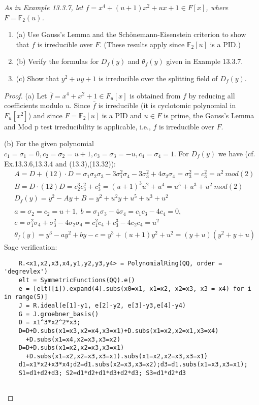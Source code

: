 \documentclass[11pt,a4paper]{article}
\newcommand{\be} {\begin{enumerate}}
\newcommand{\ee} {\end{enumerate}}
\begin{document}
{\it As in Example 13.3.7, let $f=x^4+(u+1)x^2+ux+1 \in F[x]$, where $F=\mathbb{F}_2(u)$.
\be
\item[(a)] Use Gauss's Lemma and the Sch\"onemann-Eisenstein criterion to show that $f$ is irreducible over $F$. (These results apply since $\mathbb{F}_2[u]$ is a PID.) 
\item[(b)] Verify the formulas for $D_f(y)$ and $\theta_f(y)$ given in Example 13.3.7.
\item[(c)] Show that $y^2+uy+1$ is irreducible over the splitting field of $D_f(y)$.
\ee
\begin{proof}
\item[(a)] Let 
$\bar f=x^4+x^2+1\in F_u[x]$ is obtained from $f$ by reducing all coefficients modulo $u$. Since $\bar f$ is irreducible (it is cyclotomic polynomial in $F_u[x^2]$) and since $F=\mathbb{F}_2[u]$ is a PID and $u \in F$ is prime, the Gauss's Lemma and Mod p test irreducibility is applicable, i.e., $f$ is irreducible over $F$.

\item[(b)] For the given polynomial $c_1=\sigma_1=0,c_2=\sigma_2=u+1,c_3=\sigma_3=-u,c_4=\sigma_4=1$. For $D_f(y)$ we have (cf. Ex.13.3.6,13.3.4 and (13.3),(13.32)):
\begin{align*}
& A=D+(12)\cdot D =\sigma_1\sigma_2\sigma_3 -3 \sigma_1^2 \sigma_4 -3\sigma_3^2 + 4\sigma_2 \sigma_4=\sigma_3^2=c_3^2=u^2~ mod(2)\\
& B=D\cdot (12)D=c_2^3c_3^2+c_3^4=(u+1)^3u^2+u^4=u^5+u^3+u^2~ mod(2)\\
& D_f(y)=y^2-Ay+B=y^2+u^2y+u^5+u^3+u^2\\
& \\
& a=\sigma_2=c_2=u+1,~b=\sigma_1\sigma_3-4\sigma_4=c_1c_3-4c_4=0,\\
& c= \sigma_1^2\sigma_4+\sigma_3^2-4\sigma_2\sigma_4=c_1^2c_4+c_3^3-4c_2c_4=u^2\\
& \theta_f(y)=y^3-ay^2+by-c=y^3+(u+1)y^2+u^2=(y+u)(y^2+y+u)
\end{align*}
Sage verification:
\begin{verbatim}
    R.<x1,x2,x3,x4,y1,y2,y3,y4> = PolynomialRing(QQ, order = 'degrevlex')
    elt = SymmetricFunctions(QQ).e()
    e = [elt([i]).expand(4).subs(x0=x1, x1=x2, x2=x3, x3 = x4) for i in range(5)]
    J = R.ideal(e[1]-y1, e[2]-y2, e[3]-y3,e[4]-y4)
    G = J.groebner_basis()
    D = x1^3*x2^2*x3;
    D=D+D.subs(x1=x3,x2=x4,x3=x1)+D.subs(x1=x2,x2=x1,x3=x4)
      +D.subs(x1=x4,x2=x3,x3=x2)
    D=D+D.subs(x1=x2,x2=x3,x3=x1)
      +D.subs(x1=x2,x2=x3,x3=x1).subs(x1=x2,x2=x3,x3=x1)
    d1=x1*x2+x3*x4;d2=d1.subs(x2=x3,x3=x2);d3=d1.subs(x1=x3,x3=x1);
    S1=d1+d2+d3; S2=d1*d2+d1*d3+d2*d3; S3=d1*d2*d3


\end{verbatim}
\end{proof}}
\end{document}
